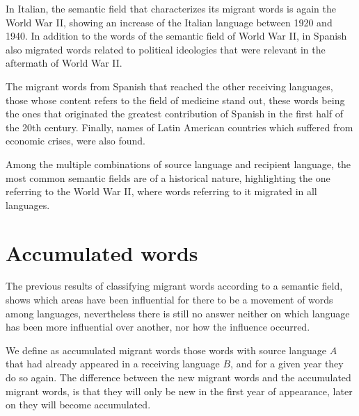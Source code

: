 \documentclass[10pt,letterpaper]{article} %
\begin{document}
In Italian, the semantic field that characterizes its migrant words  is again the World War II, showing an increase of the Italian language between 1920 and 1940. In addition to the words of the semantic field of World War II, in Spanish also migrated words related to political ideologies that were relevant in the aftermath of World War II.


The migrant words from Spanish that reached the other receiving languages, those whose content refers to the field of medicine stand out, these words being the ones that originated the greatest contribution of Spanish in the first half of the 20th century. Finally, names of Latin American countries  which suffered from economic crises, were also found.

Among the multiple combinations of source language and recipient language, the most common semantic fields are of a historical nature, highlighting the one referring to the World War II, where words referring to it migrated in all languages.



\section*{Accumulated words} %
The previous results of classifying migrant words according to a semantic field, shows which areas have been influential for there to be a movement of words among languages, nevertheless there is still no answer neither on which language has been more influential over another, nor how the influence occurred.

We define as accumulated migrant words those words with source language $A$ that had already appeared in a receiving language $B$, and for a given year they do so again. The difference between the new migrant words and the accumulated migrant words, is that they will only be new in the first year of appearance, later on they will become accumulated.
\end{document}
